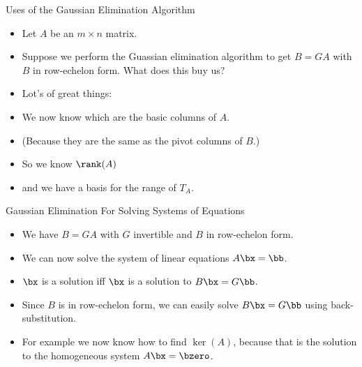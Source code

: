 \documentclass{beamer}
\begin{document}

\begin{frame}{Uses of the Gaussian Elimination Algorithm}

\begin{itemize}
\item Let $A$ be an $m\times n$ matrix.
\item Suppose we perform the Guassian elimination algorithm to get $B=GA$
with $B$ in row-echelon form. What does this buy us?
\item Lot's of great things:
\item We now know which are the basic columns of $A$.
\item (Because they are the same as the pivot columns of $B$.)
\item So we know $\rank(A)$
\item and we have a basis for the range of $T_A$.
\end{itemize}
\end{frame}


\begin{frame}{Gaussian Elimination For Solving Systems of Equations}

\begin{itemize}
\item We have $B=GA$ with $G$ invertible and $B$ in row-echelon form.
\item We can now solve the system of linear equations $A\bx=\bb$.
\item $\bx$ is a solution iff $\bx$ is a solution to $B\bx=G\bb$.
\item Since $B$ is in row-echelon form, we can easily solve $B\bx=G\bb$ using
back-substitution.
\item For example we now know how to find $\ker(A)$, because that is the solution to
the homogeneous system $A\bx=\bzero$.
\end{itemize}
\end{frame}

\end{document}
